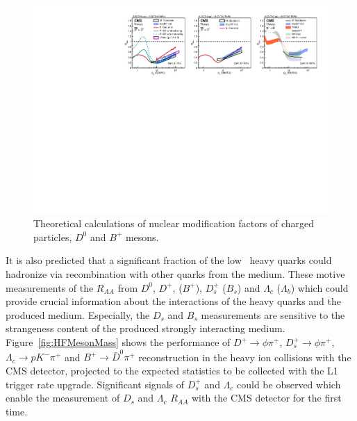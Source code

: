 \begin{figure}[!ht]
\begin{center}
\includegraphics[width=.98\textwidth]{figures/cTheoryRAA_BD_v1.pdf}
\caption{Theoretical calculations of nuclear modification factors of charged particles, $D^0$ and $B^+$ mesons.}
\label{fig:RAA_theory}
\end{center}
\end{figure}

It is also predicted that a significant fraction of the low \pt\ heavy quarks could hadronize via recombination with other quarks from the medium. These motive measurements of the $R_{AA}$ from $D^0$, $D^+$, ($B^+$), $D_s^+$ ($B_s$) and $\Lambda_c$ ($\Lambda_b$) which could provide crucial information about the interactions of the heavy quarks and the produced medium. Especially, the $D_s$ and $B_s$ measurements are sensitive to the strangeness content of the produced strongly interacting medium. Figure~\ref{fig:HFMesonMass} shows the performance of $D^+\rightarrow \phi\pi^+$, $D_s^+\rightarrow \phi \pi^+$, $\Lambda_c\rightarrow p K^-\pi^+$ and $B^+\rightarrow \bar{D}^0 \pi^+$ reconstruction in the heavy ion collisions with the CMS detector, projected to the expected statistics to be collected with the L1 trigger rate upgrade. Significant signals of $D_s^+$ and $\Lambda_c$ could be observed which enable the measurement of $D_s$ and $\Lambda_c$ $R_{AA}$ with the CMS detector for the first time. 


